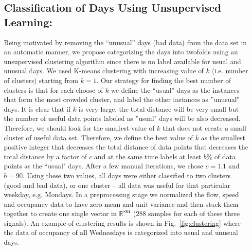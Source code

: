 \documentclass[twocolumn,10pt]{asme2e}
\begin{document}
\subsection{Classification of Days Using Unsupervised Learning:}
Being motivated by removing the ``unusual'' days (bad data) from the data set in an automatic manner, we propose categorizing the days into twofolds using an unsupervised clustering algorithm since there is no label available for usual and unusual days. We used K-means clustering with increasing value of $k$ (i.e. number of clusters) starting from $k=1$. Our strategy for finding the best number of clusters is that for each choose of $k$ we define the ``usual'' days as the instances that form the most crowded cluster, and label the other instances as ''unusual" days. It is clear that if $k$ is very large, the total distance will be very small but the number of useful data points labeled as ''usual" days will be also decreased. Therefore, we should look for the smallest value of $k$ that does not create a small cluster of useful data set. Therefore, we define the best value of $k$ as the smallest positive integer that decreases the total distance of data points that decreases the total distance by a factor of $c$ and at the same time labels at least $b\%$ of data points as the ``usual" days. After a few manual iterations, we chose $c=1.1$ and $b=90$. Using these two values, all days were either classified to two clusters (good and bad data), or one cluster -- all data was useful for that particular weekday, e.g. Mondays. In a preprocessing stage we normalized the flow, speed and occupancy data to have zero mean and unit variance and then stuck them together to create one single vector in $\mathbb{R}^{864}$ ($288$ samples for each of these three signals). An example of clustering results is shown in Fig.~\ref{fig:clustering} where the data of occupancy of all Wednesdays is categorized into usual and unusual days.
\end{document}
